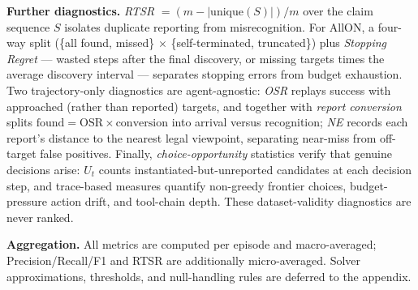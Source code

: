 \textbf{Further diagnostics.}
\emph{RTSR} $= (m - |\mathrm{unique}(S)|)/m$ over the claim sequence $S$ isolates duplicate reporting from misrecognition. For AllON, a four-way split (\{all found, missed\} $\times$ \{self-terminated, truncated\}) plus \emph{Stopping Regret} — wasted steps after the final discovery, or missing targets times the average discovery interval — separates stopping errors from budget exhaustion. Two trajectory-only diagnostics are agent-agnostic: \emph{OSR} replays success with approached (rather than reported) targets, and together with \emph{report conversion} splits $\mathrm{found} = \mathrm{OSR} \times \mathrm{conversion}$ into arrival versus recognition; \emph{NE} records each report's distance to the nearest legal viewpoint, separating near-miss from off-target false positives. Finally, \emph{choice-opportunity} statistics verify that genuine decisions arise: $U_t$ counts instantiated-but-unreported candidates at each decision step, and trace-based measures quantify non-greedy frontier choices, budget-pressure action drift, and tool-chain depth. These dataset-validity diagnostics are never ranked.

\textbf{Aggregation.}
All metrics are computed per episode and macro-averaged; Precision/Recall/F1 and RTSR are additionally micro-averaged. Solver approximations, thresholds, and null-handling rules are deferred to the appendix.
